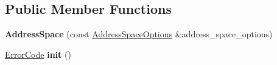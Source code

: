 \subsection*{Public Member Functions}
\begin{DoxyCompactItemize}
\item 
{\bfseries Address\+Space} (const \hyperlink{structalps_1_1AddressSpaceOptions}{Address\+Space\+Options} \&address\+\_\+space\+\_\+options)\hypertarget{classalps_1_1AddressSpace_a4111cdf0156a0d6d0a865bef8d6a97b3}{}\label{classalps_1_1AddressSpace_a4111cdf0156a0d6d0a865bef8d6a97b3}

\item 
\hyperlink{group__ERRORCODES_ga6263a3c9a0b8d36aea21cdd835ac99fe}{Error\+Code} {\bfseries init} ()\hypertarget{classalps_1_1AddressSpace_aacc0bbb475a53159d582cb3c9a15109a}{}\label{classalps_1_1AddressSpace_aacc0bbb475a53159d582cb3c9a15109a}


\end{DoxyCompactItemize}
